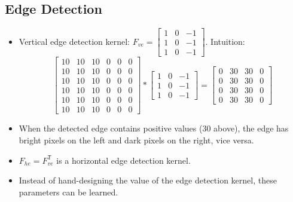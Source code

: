 \subsection{Edge Detection}
\begin{itemize}
  \item Vertical edge detection kernel:
  $F_{ve}=\begin{bmatrix}
    1 & 0 & -1 \\
    1 & 0 & -1 \\
    1 & 0 & -1
  \end{bmatrix}$. Intuition: 
  \[\begin{bmatrix}
    10 & 10 & 10 & 0 & 0 & 0 \\
    10 & 10 & 10 & 0 & 0 & 0 \\
    10 & 10 & 10 & 0 & 0 & 0 \\
    10 & 10 & 10 & 0 & 0 & 0 \\
    10 & 10 & 10 & 0 & 0 & 0 \\
    10 & 10 & 10 & 0 & 0 & 0
  \end{bmatrix} * \begin{bmatrix}
    1 & 0 & -1 \\
    1 & 0 & -1 \\
    1 & 0 & -1
  \end{bmatrix}=\begin{bmatrix}
    0 & 30 & 30 & 0 \\
    0 & 30 & 30 & 0 \\
    0 & 30 & 30 & 0 \\
    0 & 30 & 30 & 0
  \end{bmatrix} \]
  \item When the detected edge contains positive values (30 above), the edge has bright pixels on the left and dark pixels on the right, vice versa.
  \item $F_{he}=F_{ve}^{\mathsf{T}}$ is a horizontal edge detection kernel.
  \item Instead of hand-designing the value of the edge detection kernel, these parameters can be learned. 
\end{itemize}
